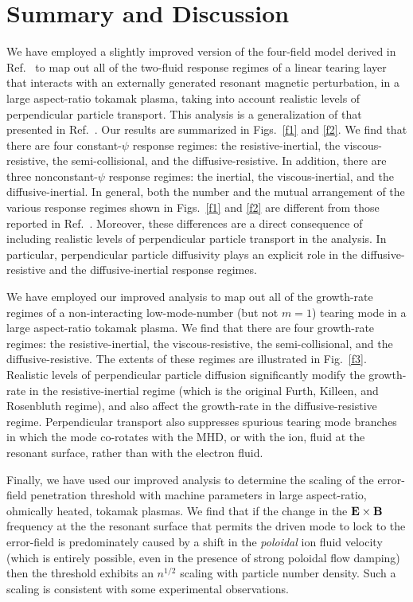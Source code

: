 \documentclass[12pt,prb,aps]{revtex4-1}
\begin{document}
\section{Summary and Discussion}
We have employed a slightly improved version of the four-field model derived in Ref.~ to map out  all of the
two-fluid response regimes of a  linear tearing layer that interacts with an externally generated resonant magnetic perturbation,  in a large aspect-ratio tokamak plasma, 
taking into account realistic levels of perpendicular particle transport. This analysis is a generalization of that
presented in Ref.~. Our results are summarized in Figs.~\ref{f1} and
\ref{f2}. We find that there are four constant-$\psi$ response regimes: the resistive-inertial, the viscous-resistive, the
semi-collisional, and the diffusive-resistive. In addition, there are three nonconstant-$\psi$ response regimes: the inertial, the
viscous-inertial, and the diffusive-inertial. In general, both the number and the mutual arrangement of the various response regimes shown
in Figs.~\ref{f1} and \ref{f2} are different from those reported in Ref.~. Moreover, these differences are a direct 
consequence of including realistic levels of perpendicular particle transport in the analysis. In particular, perpendicular particle
diffusivity plays an explicit role in the diffusive-resistive and the diffusive-inertial response regimes. 

We have employed our improved analysis to map out all of the growth-rate regimes of a non-interacting low-mode-number
(but not $m=1$) tearing mode in a large aspect-ratio tokamak plasma. We find that there are four growth-rate regimes:
the resistive-inertial, the viscous-resistive, the semi-collisional, and the diffusive-resistive. The extents of these regimes are illustrated in Fig.~\ref{f3}. 
Realistic levels of perpendicular particle diffusion significantly modify the growth-rate in the resistive-inertial
regime (which is the original Furth, Killeen, and Rosenbluth regime), and also affect the growth-rate in the diffusive-resistive regime. 
Perpendicular transport also suppresses spurious tearing mode branches in which the mode co-rotates with the MHD, or with the ion,
fluid at the resonant surface, rather than with the electron fluid. 

Finally, we have used our improved analysis to determine the scaling of the error-field penetration threshold with machine parameters in 
large aspect-ratio, ohmically heated, tokamak plasmas. We find that if the change in the ${\bf E}\times {\bf B}$ frequency at the the resonant surface that permits the
driven mode to lock to the error-field is predominately caused by a  shift in the  {\em poloidal}\/ ion fluid velocity (which is entirely possible,
even in the presence of strong poloidal flow damping) then the threshold exhibits an $n^{1/2}$ scaling with particle
number density. Such a scaling is consistent with some experimental observations. 
\end{document}
